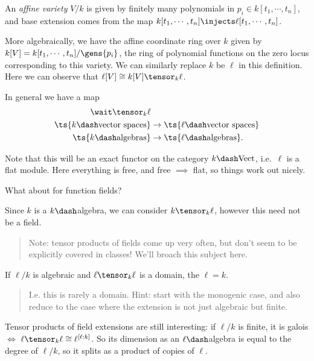\begin{example}

An \emph{affine variety} \(V/k\) is given by finitely many polynomials
in \(p_i \in k[t_1, \cdots, t_n]\), and base extension comes from the
map \(k[t_1, \cdots, t_n] \injects \ell[t_1, \cdots, t_n]\).

More algebraically, we have the affine coordinate ring over \(k\) given
by \(k[V] = k[t_1,\cdots, t_n]/\gens{p_i}\), the ring of polynomial
functions on the zero locus corresponding to this variety. We can
similarly replace \(k\) be \(\ell\) in this definition. Here we can
observe that \(\ell[V] \cong k[V] \tensor_k \ell\).

\end{example}

In general we have a map
\begin{align*}  
\wait \tensor_k \ell & \\
\ts{k\dash\text{vector spaces}} &\to \ts{\ell\dash\text{vector spaces}} \\
\ts{k\dash\text{algebras}} &\to\ts{\ell\dash\text{algebras}}
.\end{align*}

Note that this will be an exact functor on the category
\(k\dash\text{Vect}\), i.e.~\(\ell\) is a flat module. Here everything
is free, and free \(\implies\) flat, so things work out nicely.

What about for function fields?

Since \(k\) is a \(k\dash\)algebra, we can consider \(k\tensor_k \ell\),
however this need not be a field.

\begin{quote}
Note: tensor products of fields come up very often, but don't seem to be
explicitly covered in classes! We'll broach this subject here.
\end{quote}

\begin{exercise}

If \(\ell/k\) is algebraic and \(\ell\tensor_k \ell\) is a domain, the
\(\ell = k\).

\begin{quote}
I.e. this is rarely a domain. Hint: start with the monogenic case, and
also reduce to the case where the extension is not just algebraic but
finite.
\end{quote}

\end{exercise}

Tensor products of field extensions are still interesting: if \(\ell/k\)
is finite, it is galois \(\iff\)
\(\ell \tensor_k \ell \cong \ell^{[\ell: k]}\). So its dimension as an
\(\ell\dash\)algebra is equal to the degree of \(\ell/k\), so it splits
as a product of copies of \(\ell\).

